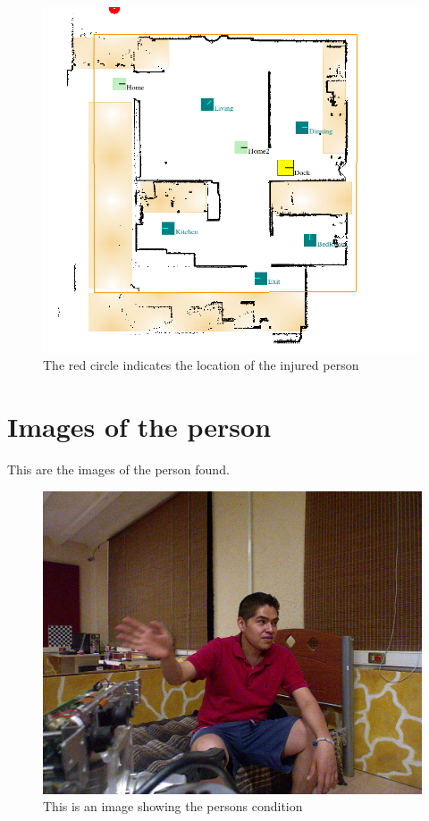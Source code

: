 \documentclass[11pt]{article}
\begin{document}
\begin{figure}[h]
	\begin{center}
		\includegraphics[width=1\textwidth]{locationPeersonHurt.png}
		\caption{The red circle indicates the location of the injured person}
	\end{center}
\end{figure}

\section{Images of the person}

This are the images of the person found.

\begin{figure}[h]
	\begin{center}
		\includegraphics[width=1\textwidth]{imgPeersonHurt.png}
		\caption{This is an image showing the persons condition}
	\end{center}
\end{figure}
\end{document}
